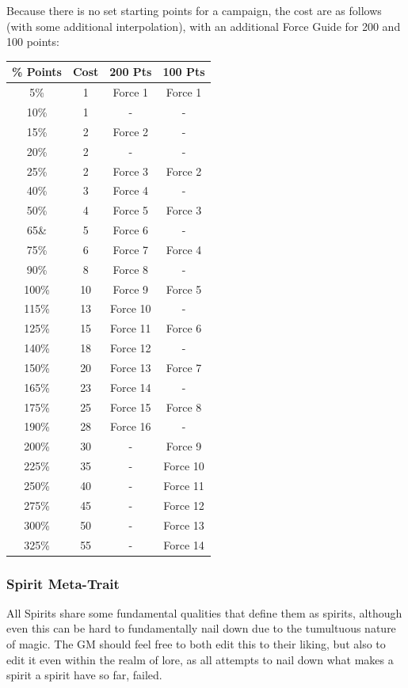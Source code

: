 \begin{multicols}{3}
	Because there is no set starting points for a campaign, the cost are as follows (with some additional interpolation), with an additional Force Guide for 200 and 100 points:
	\begin{center} \label{spirit_ally_cost}
		\begin{tabular}{|c|c|c|c|}
			\hline
			\% Points & Cost & 200 Pts & 100 Pts\\
			\hline
			\hline
			5\% & 1 & Force 1 & Force 1 \\
			10\% & 1 & - & - \\
			15\% & 2 & Force 2 & - \\
			20\% & 2 & - & - \\
			25\% & 2 & Force 3 & Force 2 \\
			40\% & 3 & Force 4 & - \\
			50\% & 4 & Force 5 & Force 3 \\
			65\& & 5 & Force 6 & - \\
			75\% & 6 & Force 7 & Force 4 \\
			90\% & 8 & Force 8 & - \\
			100\% & 10 & Force 9 & Force 5 \\
			115\% & 13 & Force 10 & - \\
			125\% & 15 & Force 11 & Force 6 \\
			140\% & 18 & Force 12 & - \\
			150\% & 20 & Force 13 & Force 7 \\
			165\% & 23 & Force 14 & - \\
			175\% & 25 & Force 15 & Force 8 \\
			190\% & 28 & Force 16 & - \\
			200\% & 30 & - & Force 9 \\
			225\% & 35 & - & Force 10 \\
			250\% & 40 & - & Force 11 \\
			275\% & 45 & - & Force 12 \\
			300\% & 50 & - & Force 13 \\
			325\% & 55 & - & Force 14 \\
			\hline
		\end{tabular}
	\end{center}
	
	\subsubsection{Spirit Meta-Trait}\label{spirit_meta_trait}
	
	All Spirits share some fundamental qualities that define them as spirits, although even this can be hard to fundamentally nail down due to the tumultuous nature of magic. The GM should feel free to both edit this to their liking, but also to edit it even within the realm of lore, as all attempts to nail down what makes a spirit a spirit have so far, failed.   
	

\end{multicols}
